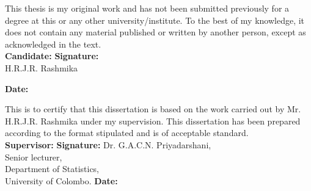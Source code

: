 \documentclass[12pt]{report}
\begin{document}
{\setlength{\parindent}{0pt}
This thesis is my original work and has not been submitted previously for a degree at this or any other university/institute. To the best of my knowledge, it does not contain any material published or written by another person, except as acknowledged in the text.\\ [0.5 cm]

\noindent
\textbf{Candidate:}    \hspace{3.75cm} \textbf{Signature:} \underline{\hspace{6cm}}  \\
H.R.J.R. Rashmika
\vspace{0.5cm}

\noindent
\hspace{6cm}  \textbf{Date:} \underline{\hspace{7cm}} 

\vspace{1cm}

This is to certify that this dissertation is based on the work carried out by Mr. H.R.J.R. Rashmika under my supervision. This dissertation has been prepared according to the format stipulated and is of acceptable standard.\\ [0.5 cm]

\noindent
\textbf{Supervisor:}    \hspace{3.56cm} \textbf{Signature:} \underline{\hspace{6cm}}  
\hspace{8.25cm} Dr. G.A.C.N. Priyadarshani, \\
\hspace{8.25cm} Senior lecturer, \\
\hspace{8.25cm} Department of Statistics,  \\
\hspace{8.25cm} University of Colombo. \hspace{2.3cm} \textbf{Date:} \underline{\hspace{7cm}} \\

}


\tableofcontents
{}

\listoffigures 
{}

\listoftables   
{}



\end{document}
